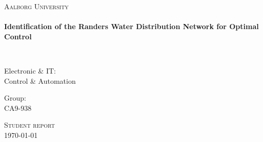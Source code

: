 \thispagestyle{empty}

\begin{center}

\vspace*{\fill}

\textsc{\LARGE Aalborg University}\\[1.0cm]

\HRule \\[0.2cm]
{ \LARGE \bfseries  Identification of the Randers Water Distribution Network for Optimal Control \\[0.2cm] }

\HRule \\[1.5cm]%

\begin{minipage}{0.4\textwidth}
\begin{flushleft} \large
Electronic \& IT:\\
Control \& Automation
\end{flushleft}
\end{minipage}
\begin{minipage}{0.4\textwidth}
\begin{flushright} \large
Group: \\
CA9-938
\end{flushright}
\end{minipage}

\vspace*{\fill}

\textsc{\Large Student report}\\[1.0cm]

{\large \today}

\end{center}